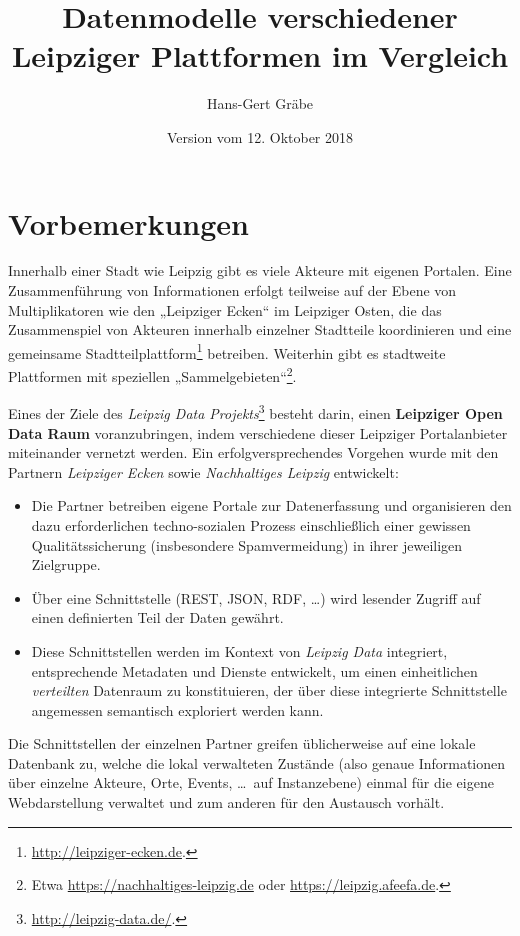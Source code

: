 \documentclass[a4paper,11pt]{article}
\title{Datenmodelle verschiedener\\ Leipziger Plattformen im Vergleich}
\author{Hans-Gert Gräbe}
\date{Version vom 12. Oktober 2018}
\begin{document}
\maketitle
\tableofcontents 
\newpage

\section{Vorbemerkungen}

Innerhalb einer Stadt wie Leipzig gibt es viele Akteure mit eigenen Portalen.
Eine Zusammenführung von Informationen erfolgt teilweise auf der Ebene von
Multiplikatoren wie den „Leipziger Ecken“ im Leipziger Osten, die das
Zusammenspiel von Akteuren innerhalb einzelner Stadtteile koordinieren und
eine gemeinsame Stadtteilplattform\footnote{\url{http://leipziger-ecken.de}.}
betreiben.  Weiterhin gibt es stadtweite Plattformen mit speziellen
„Sammelgebieten“\footnote{Etwa \url{https://nachhaltiges-leipzig.de} oder
\url{https://leipzig.afeefa.de}.}.

Eines der Ziele des \emph{Leipzig Data
  Projekts}\footnote{\url{http://leipzig-data.de/}.} besteht darin, einen
\textbf{Leipziger Open Data Raum} voranzubringen, indem verschiedene dieser
Leipziger Portalanbieter miteinander vernetzt werden. Ein erfolgversprechendes
Vorgehen wurde mit den Partnern \emph{Leipziger Ecken} sowie
\emph{Nachhaltiges Leipzig} entwickelt:
\begin{itemize}
\item [1)] Die Partner betreiben eigene Portale zur Datenerfassung und
  organisieren den dazu erforderlichen techno-sozialen Prozess einschließlich
  einer gewissen Qualitätssicherung (insbesondere Spamvermeidung) in ihrer
  jeweiligen Zielgruppe. 
\item [2)] Über eine Schnittstelle (REST, JSON, RDF, \ldots) wird lesender
  Zugriff auf einen definierten Teil der Daten gewährt.
\item [3)] Diese Schnittstellen werden im Kontext von \emph{Leipzig Data}
  integriert, entsprechende Metadaten und Dienste entwickelt, um einen
  einheitlichen \emph{verteilten} Datenraum zu konstituieren, der über diese
  integrierte Schnittstelle angemessen semantisch exploriert werden kann. 
\end{itemize}
Die Schnittstellen der einzelnen Partner greifen üblicherweise auf eine lokale
Datenbank zu, welche die lokal verwalteten Zustände (also genaue Informationen
über einzelne Akteure, Orte, Events, \ldots\ auf Instanzebene) einmal für die
eigene Webdarstellung verwaltet und zum anderen für den Austausch vorhält. 
\end{document}
